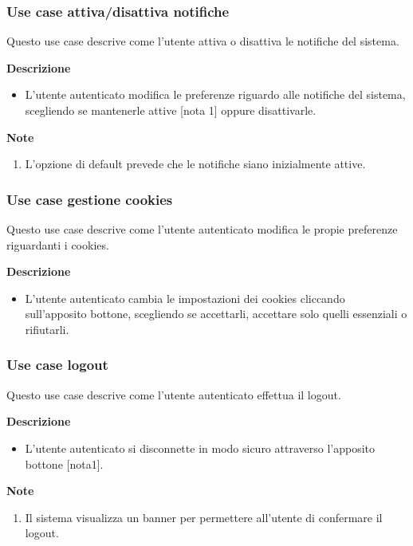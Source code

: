 \documentclass[a4paper,12pt]{article}
\begin{document}
\subsubsection*{Use case attiva/disattiva notifiche}

Questo use case descrive come l'utente attiva o disattiva le notifiche del sistema.

\textbf{Descrizione}
\begin{itemize} \setlength\itemsep{0.01em}
\item L'utente autenticato modifica le preferenze riguardo alle notifiche del sistema, scegliendo se mantenerle attive [nota 1] oppure disattivarle.
\end{itemize}

\textbf{Note}
\begin{enumerate} \setlength\itemsep{0.01em}
\item L'opzione di default prevede che le notifiche siano inizialmente attive.
\end{enumerate}

\subsubsection*{Use case gestione cookies}

Questo use case descrive come l'utente autenticato modifica le propie preferenze riguardanti i cookies.

\textbf{Descrizione}
\begin{itemize} \setlength\itemsep{0.01em}
\item L'utente autenticato cambia le impostazioni dei cookies cliccando sull'apposito bottone, scegliendo se accettarli, accettare solo quelli essenziali o rifiutarli.
\end{itemize}

\subsubsection*{Use case logout}

Questo use case descrive come l'utente autenticato effettua il logout.

\textbf{Descrizione}
\begin{itemize} \setlength\itemsep{0.01em}
\item L'utente autenticato si disconnette in modo sicuro attraverso l'apposito bottone [nota1].
\end{itemize}

\textbf{Note}
\begin{enumerate} \setlength\itemsep{0.01em}
\item Il sistema visualizza un banner per permettere all'utente di confermare il logout.
\end{enumerate}
\end{document}
